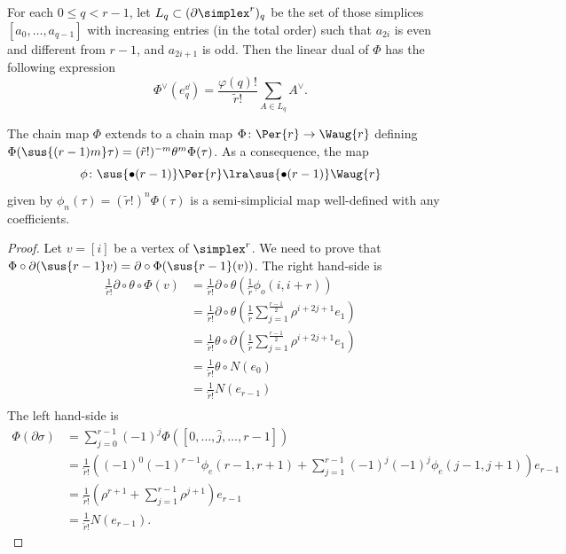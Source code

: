 \begin{remark}\label{remark:phidual}
	For each $0\leq q<r-1$, let $L_q \subset (\partial \simplex^{r})_q$ be the set of those simplices $[a_0,\dots, a_{q-1}]$ with increasing entries (in the total order) such that $a_{2i}$ is even and different from $r-1$, and $a_{2i+1}$ is odd. Then the linear dual of $\Phi$ has the following expression
	\begin{equation}\label{eq:111}
		\Phi^\vee(e_{q}^\dd) = \frac{\varphi(q)!}{\tilde{r}!}\sum_{A\in L_q} A^\vee.
	\end{equation}
\end{remark}

\begin{proposition}\label{prop:per_to_minimal}
	The chain map $\Phi$ extends to a chain map $\Phi\colon \Per{r}\to \Waug{r}$ defining $\Phi(\sus{(r-1)m}\tau) = (\tilde{r}!)^{-m}\theta^{m}\Phi(\tau)$. As a consequence, the map 
	\[
		\phi\colon \sus{\bullet (r-1)}\Per{r}\lra \sus{\bullet(r-1)}\Waug{r}
	\] 
	given by $\phi_n(\tau) = (\tilde{r}!)^n\Phi(\tau)$ is a semi-simplicial map well-defined with any coefficients.
\end{proposition}
\begin{proof}                                                                          
	Let $v = [i]$ be a vertex of $\simplex^{r}$. We need to prove that $\Phi\circ \partial(\sus{r-1}v) = \partial\circ \Phi(\sus{r-1}(v))$. The right hand-side is 
	\begin{align*}
		\frac{1}{\tilde{r}!} \partial\circ \theta \circ \Phi(v) &= 
		\frac{1}{\tilde{r}!} \partial\circ \theta \left(\frac{1}{\tilde{r}}\phi_o(i,i+r)\right) \\
		&= \frac{1}{\tilde{r}!} \partial\circ \theta \left(\frac{1}{\tilde{r}}\sum_{j=1}^{\frac{r-1}{2}}\rho^{i+2j+1} e_{1}\right) \\
		&= \frac{1}{\tilde{r}!} \theta\circ\partial \left(\frac{1}{\tilde{r}}\sum_{j=1}^{\frac{r-1}{2}}\rho^{i+2j+1} e_{1}\right) \\
		&= \frac{1}{\tilde{r}!} \theta\circ N(e_0) \\
		&= \frac{1}{\tilde{r}!} N(e_{r-1}) \\
		\end{align*}
	The left hand-side is
	\begin{align*}
		\Phi(\partial\sigma) &= \sum_{j=0}^{r-1} (-1)^j\Phi([0,\ldots,\hat{j},\ldots,r-1]) \\
		&= \frac{1}{\tilde{r}!}\left((-1)^0(-1)^{r-1}\phi_e(r-1,r+1)+\sum_{j=1}^{r-1} (-1)^j(-1)^{j}\phi_e(j-1,j+1)\right)e_{r-1} \\
		&= \frac{1}{\tilde{r}!}\left (\rho^{r+1}+\sum_{j=1}^{r-1} \rho^{j+1}\right) e_{r-1} \\
		&= \frac{1}{\tilde{r}!}N(e_{r-1}).
	\end{align*}
\end{proof}
